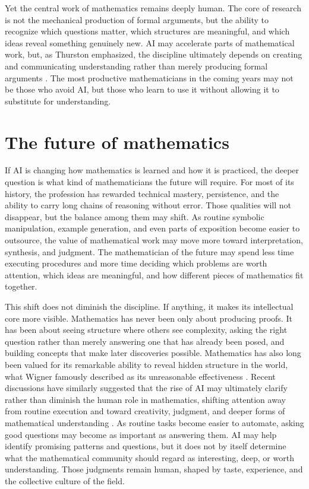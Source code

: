 \documentclass[12pt]{article}
\begin{document}
Yet the central work of mathematics remains deeply human. The core of research is not the mechanical production of formal arguments, but the ability to recognize which questions matter, which structures are meaningful, and which ideas reveal something genuinely new. AI may accelerate parts of mathematical work, but, as Thurston emphasized, the discipline ultimately depends on creating and communicating understanding rather than merely producing formal arguments \cite{thurston1994}. The most productive mathematicians in the coming years may not be those who avoid AI, but those who learn to use it without allowing it to substitute for understanding.

\section{The future of mathematics}
If AI is changing how mathematics is learned and how it is practiced, the deeper question is what kind of mathematicians the future will require. For most of its history, the profession has rewarded technical mastery, persistence, and the ability to carry long chains of reasoning without error. Those qualities will not disappear, but the balance among them may shift. As routine symbolic manipulation, example generation, and even parts of exposition become easier to outsource, the value of mathematical work may move more toward interpretation, synthesis, and judgment. The mathematician of the future may spend less time executing procedures and more time deciding which problems are worth attention, which ideas are meaningful, and how different pieces of mathematics fit together.

This shift does not diminish the discipline. If anything, it makes its intellectual core more visible. Mathematics has never been only about producing proofs. It has been about seeing structure where others see complexity, asking the right question rather than merely answering one that has already been posed, and building concepts that make later discoveries possible. Mathematics has also long been valued for its remarkable ability to reveal hidden structure in the world, what Wigner famously described as its unreasonable effectiveness \cite{wigner1960}. Recent discussions have similarly suggested that the rise of AI may ultimately clarify rather than diminish the human role in mathematics, shifting attention away from routine execution and toward creativity, judgment, and deeper forms of mathematical understanding \cite{alper2026}. As routine tasks become easier to automate, asking good questions may become as important as answering them. AI may help identify promising patterns and questions, but it does not by itself determine what the mathematical community should regard as interesting, deep, or worth understanding. Those judgments remain human, shaped by taste, experience, and the collective culture of the field.
\end{document}
